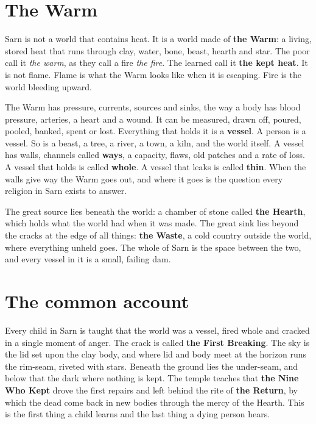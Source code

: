 \documentclass{design/chronicle}
\begin{document}
\section*{The Warm}

Sarn is not a world that contains heat. It is a world made of \textbf{the Warm}: a living, stored heat that runs through clay, water, bone, beast, hearth and star. The poor call it \emph{the warm}, as they call a fire \emph{the fire}. The learned call it \textbf{the kept heat}. It is not flame. Flame is what the Warm looks like when it is escaping. Fire is the world bleeding upward.

The Warm has pressure, currents, sources and sinks, the way a body has blood pressure, arteries, a heart and a wound. It can be measured, drawn off, poured, pooled, banked, spent or lost. Everything that holds it is a \textbf{vessel}. A person is a vessel. So is a beast, a tree, a river, a town, a kiln, and the world itself. A vessel has walls, channels called \textbf{ways}, a capacity, flaws, old patches and a rate of loss. A vessel that holds is called \textbf{whole}. A vessel that leaks is called \textbf{thin}. When the walls give way the Warm goes out, and where it goes is the question every religion in Sarn exists to answer.

The great source lies beneath the world: a chamber of stone called \textbf{the Hearth}, which holds what the world had when it was made. The great sink lies beyond the cracks at the edge of all things: \textbf{the Waste}, a cold country outside the world, where everything unheld goes. The whole of Sarn is the space between the two, and every vessel in it is a small, failing dam.

\section*{The common account}

Every child in Sarn is taught that the world was a vessel, fired whole and cracked in a single moment of anger. The crack is called \textbf{the First Breaking}. The sky is the lid set upon the clay body, and where lid and body meet at the horizon runs the rim-seam, riveted with stars. Beneath the ground lies the under-seam, and below that the dark where nothing is kept. The temple teaches that \textbf{the Nine Who Kept} drove the first repairs and left behind the rite of \textbf{the Return}, by which the dead come back in new bodies through the mercy of the Hearth. This is the first thing a child learns and the last thing a dying person hears.
\end{document}
